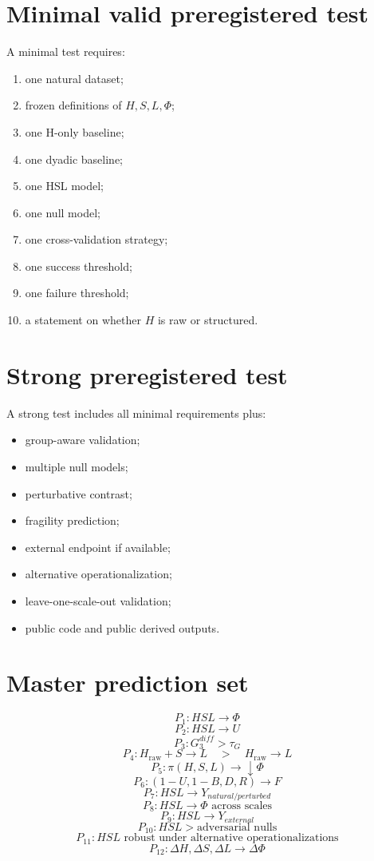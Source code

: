 \documentclass[11pt,a4paper]{article}
\newcommand{\Hraw}{H_{\mathrm{raw}}}
\begin{document}
\section{Minimal valid preregistered test}

A minimal test requires:
\begin{enumerate}
\item one natural dataset;
\item frozen definitions of $H,S,L,\Phi$;
\item one H-only baseline;
\item one dyadic baseline;
\item one HSL model;
\item one null model;
\item one cross-validation strategy;
\item one success threshold;
\item one failure threshold;
\item a statement on whether $H$ is raw or structured.
\end{enumerate}

\section{Strong preregistered test}

A strong test includes all minimal requirements plus:
\begin{itemize}
\item group-aware validation;
\item multiple null models;
\item perturbative contrast;
\item fragility prediction;
\item external endpoint if available;
\item alternative operationalization;
\item leave-one-scale-out validation;
\item public code and public derived outputs.
\end{itemize}

\section{Master prediction set}

\[
P_1:HSL\rightarrow\Phi
\]
\[
P_2:HSL\rightarrow U
\]
\[
P_3:G_3^{diff}>\tau_G
\]
\[
P_4:\Hraw+S\rightarrow L \quad > \quad \Hraw\rightarrow L
\]
\[
P_5:\pi(H,S,L)\rightarrow \downarrow\Phi
\]
\[
P_6:(1-U,1-B,D,R)\rightarrow F
\]
\[
P_7:HSL\rightarrow Y_{natural/perturbed}
\]
\[
P_8:HSL\rightarrow\Phi\text{ across scales}
\]
\[
P_9:HSL\rightarrow Y_{external}
\]
\[
P_{10}:HSL>\text{adversarial nulls}
\]
\[
P_{11}:HSL\text{ robust under alternative operationalizations}
\]
\[
P_{12}:\Delta H,\Delta S,\Delta L\rightarrow\Delta\Phi
\]
\end{document}
